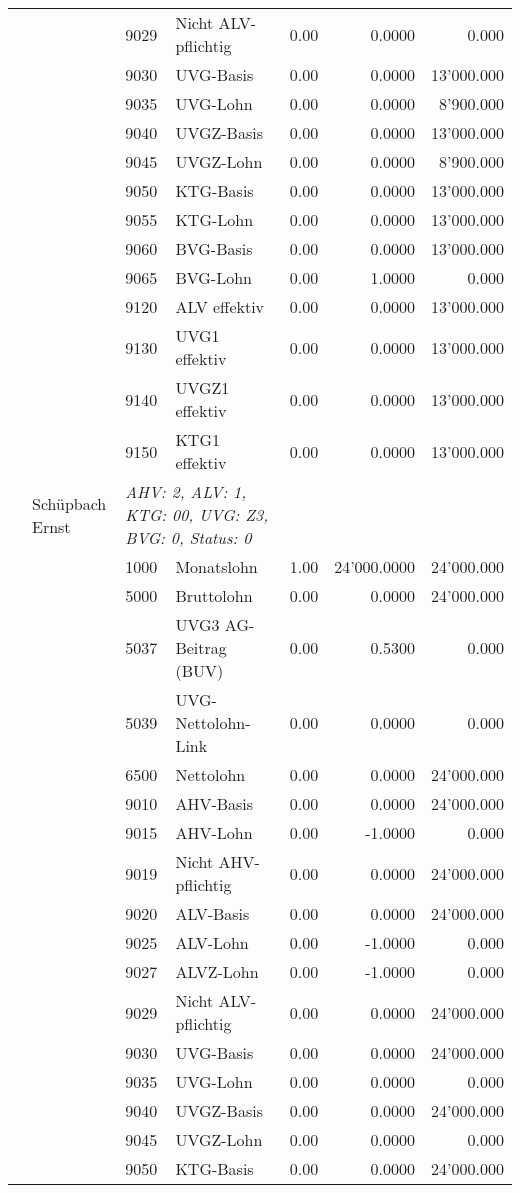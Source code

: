 \documentclass[15pt,a4paper]{article}
\begin{document}
\begin{longtable}{@{\extracolsep{\fill}}l l l l|r|r|r}
&&9029&Nicht ALV-pflichtig&0.00&0.0000&0.000\\
&&9030&UVG-Basis&0.00&0.0000&13'000.000\\
&&9035&UVG-Lohn&0.00&0.0000&8'900.000\\
&&9040&UVGZ-Basis&0.00&0.0000&13'000.000\\
&&9045&UVGZ-Lohn&0.00&0.0000&8'900.000\\
&&9050&KTG-Basis&0.00&0.0000&13'000.000\\
&&9055&KTG-Lohn&0.00&0.0000&13'000.000\\
&&9060&BVG-Basis&0.00&0.0000&13'000.000\\
&&9065&BVG-Lohn&0.00&1.0000&0.000\\
&&9120&ALV effektiv&0.00&0.0000&13'000.000\\
&&9130&UVG1 effektiv&0.00&0.0000&13'000.000\\
&&9140&UVGZ1 effektiv&0.00&0.0000&13'000.000\\
&&9150&KTG1 effektiv&0.00&0.0000&13'000.000\\
\pagebreak
30&Schüpbach Ernst&\multicolumn{2}{l|}{\small\emph{AHV: 2, ALV: 1, KTG: 00, UVG: Z3, BVG: 0, Status: 0}}&& \\
&&1000&Monatslohn&1.00&24'000.0000&24'000.000\\
&&5000&Bruttolohn&0.00&0.0000&24'000.000\\
&&5037&UVG3 AG-Beitrag (BUV)&0.00&0.5300&0.000\\
&&5039&UVG-Nettolohn-Link&0.00&0.0000&0.000\\
&&6500&Nettolohn&0.00&0.0000&24'000.000\\
&&9010&AHV-Basis&0.00&0.0000&24'000.000\\
&&9015&AHV-Lohn&0.00&-1.0000&0.000\\
&&9019&Nicht AHV-pflichtig&0.00&0.0000&24'000.000\\
&&9020&ALV-Basis&0.00&0.0000&24'000.000\\
&&9025&ALV-Lohn&0.00&-1.0000&0.000\\
&&9027&ALVZ-Lohn&0.00&-1.0000&0.000\\
&&9029&Nicht ALV-pflichtig&0.00&0.0000&24'000.000\\
&&9030&UVG-Basis&0.00&0.0000&24'000.000\\
&&9035&UVG-Lohn&0.00&0.0000&0.000\\
&&9040&UVGZ-Basis&0.00&0.0000&24'000.000\\
&&9045&UVGZ-Lohn&0.00&0.0000&0.000\\
&&9050&KTG-Basis&0.00&0.0000&24'000.000\\

\end{longtable}
\end{document}
